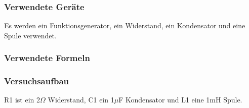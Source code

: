\documentclass[12pt,a4paper]{article}
\begin{document}
\subsubsection{Verwendete Geräte}

Es werden ein Funktionsgenerator, ein Widerstand, ein Kondensator und eine Spule verwendet.

\subsubsection{Verwendete Formeln}
\subsubsection{Versuchsaufbau}

R1 ist ein 2$\Omega$ Widerstand, C1 ein 1$\mu$F Kondensator und L1 eine 1mH Spule.
\end{document}
